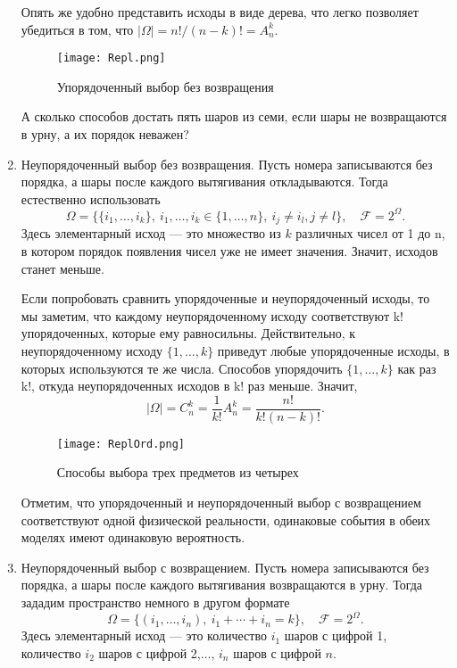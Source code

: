 \documentclass[11 pt,russian]{article}
\begin{document}
\begin{enumerate}
Опять же удобно представить исходы в виде дерева, что легко позволяет убедиться в том, что $|\Omega| = n!/(n-k)! = A_n^k$.
\begin{figure}[h!]
\caption{Упорядоченный выбор без возвращения}
   \begin{center}
   \texttt{[image: Repl.png]}
   \end{center}
\end{figure}
\begin{Que}
А сколько способов достать пять шаров из семи, если шары не возвращаются в урну, а их порядок неважен?
\end{Que}
\item Неупорядоченный выбор без возвращения. Пусть номера записываются без порядка, а шары после каждого вытягивания откладываются. Тогда естественно использовать
$$
\Omega = \{\{i_1,\dotsc,i_k\},\ i_1,\dotsc,i_k\in \{1,\dotsc,n\},\ i_j\neq i_l, j\neq l\},\quad \mathcal{F} = 2^{\Omega}.
$$
Здесь элементарный исход --- это множество из $k$ различных чисел от 1 до n, в котором порядок появления чисел уже не имеет значения. Значит, исходов станет меньше. 

Если попробовать сравнить упорядоченные и неупорядоченный исходы, то мы заметим, что каждому неупорядоченному исходу соответствуют k! упорядоченных, которые ему равносильны. Действительно, к неупорядоченному исходу $\{1,\dotsc,k\}$ приведут любые упорядоченные исходы, в которых используются те же числа. Способов упорядочить $\{1,\dotsc,k\}$ как раз k!, откуда неупорядоченных исходов в k! раз меньше. Значит,
$$
|\Omega| = C_n^k = \frac{1}{k!} A_n^k = \frac{n!}{k! (n-k)!}.
$$
\begin{figure}[h!]
\caption{Способы выбора трех предметов из четырех}
   \begin{center}
   \texttt{[image: ReplOrd.png]}
   \end{center}
\end{figure}
Отметим, что упорядоченный и неупорядоченный выбор с возвращением соответствуют одной физической реальности, одинаковые события в обеих моделях имеют одинаковую вероятность.
\item Неупорядоченный выбор с возвращением. Пусть номера записываются без порядка, а шары после каждого вытягивания возвращаются в урну. Тогда зададим пространство немного в другом формате
$$
\Omega = \{(i_1,\dotsc,i_n),\ i_1+\dotsb+i_n=k\},\quad \mathcal{F} = 2^{\Omega}.
$$
Здесь элементарный исход --- это количество $i_1$ шаров с цифрой 1, количество $i_2$ шаров с цифрой 2,$\dotsc$, $i_n$ шаров с цифрой $n$.  


\end{enumerate}
\end{document}
